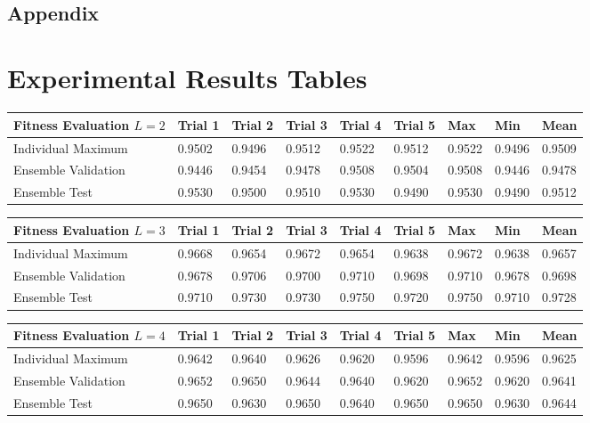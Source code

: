 \documentclass{article}
\DeclareMathOperator{\1}{\mathbbm{1}}
\begin{document}
\newpage
\begin{appendices}
  \section{\\Appendix} \label{AppendixA}
  \chapter{Experimental Results Tables}

  \begin{center}
    \begin{tabular}{ | l | l | l | l | l | l | l | l | l |}
      \hline
      Fitness Evaluation $L = 2$ & Trial 1 & Trial 2 & Trial 3 & Trial 4 & Trial 5 & Max & Min & Mean \\ \hline
      Individual Maximum & 0.9502 & 0.9496 & 0.9512 & 0.9522 & 0.9512 & 0.9522 & 0.9496 & 0.9509 \\\hline
      Ensemble Validation & 0.9446 & 0.9454 & 0.9478 & 0.9508 & 0.9504 & 0.9508 & 0.9446& 0.9478\\\hline
      Ensemble Test & 0.9530 & 0.9500 & 0.9510 & 0.9530 & 0.9490 & 0.9530 & 0.9490 & 0.9512\\\hline
    \end{tabular}
  \end{center}

  \begin{center}
    \begin{tabular}{ | l | l | l | l | l | l | l | l | l |}
      \hline
      Fitness Evaluation $L = 3$ & Trial 1 & Trial 2 & Trial 3 & Trial 4 & Trial 5 & Max & Min & Mean \\ \hline
      Individual Maximum & 0.9668 & 0.9654 & 0.9672 & 0.9654 & 0.9638 & 0.9672 & 0.9638 & 0.9657 \\\hline
      Ensemble Validation & 0.9678 & 0.9706 & 0.9700 & 0.9710 & 0.9698 & 0.9710 & 0.9678& 0.9698\\\hline
      Ensemble Test & 0.9710 & 0.9730 & 0.9730 & 0.9750 & 0.9720 & 0.9750 & 0.9710 & 0.9728\\\hline
    \end{tabular}
  \end{center}

  \begin{center}
    \begin{tabular}{ | l | l | l | l | l | l | l | l | l |}
      \hline
      Fitness Evaluation $L = 4$ & Trial 1 & Trial 2 & Trial 3 & Trial 4 & Trial 5 & Max & Min & Mean \\ \hline
      Individual Maximum & 0.9642 & 0.9640 & 0.9626 & 0.9620 & 0.9596 & 0.9642 & 0.9596 & 0.9625 \\\hline
      Ensemble Validation & 0.9652 & 0.9650 & 0.9644 & 0.9640 & 0.9620 & 0.9652 & 0.9620 & 0.9641\\\hline
      Ensemble Test & 0.9650 & 0.9630 & 0.9650 & 0.9640 & 0.9650 & 0.9650 & 0.9630 & 0.9644\\\hline
    \end{tabular}
  \end{center}

\end{appendices}
\end{document}
